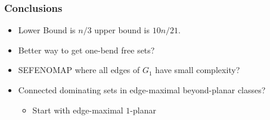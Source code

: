 \documentclass{beamer}
\begin{document}
\begin{frame}
  \frametitle{Conclusions}

  \begin{itemize}[<+->]
    \item Lower Bound is $n/3$ upper bound is $10n/21$.

    \item Better way to get one-bend free sets?

    \item SEFENOMAP where all edges of $G_1$ have small complexity?

    \item Connected dominating sets in edge-maximal beyond-planar classes?
    \begin{itemize}[<+->]
      \item Start with edge-maximal $1$-planar
    \end{itemize}
  \end{itemize}

  \begin{center}
  \end{center}
\end{frame}
\end{document}
